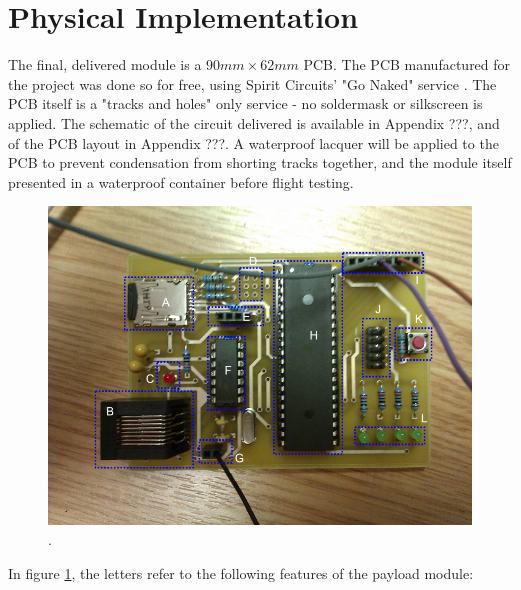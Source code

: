 \section{Physical Implementation}
\label{sec:PCB-implementation}

The final, delivered module is a $90mm\times62mm$ PCB. The PCB manufactured 
for the project was done so for free, using Spirit Circuits' "Go Naked"
service \cite{go-naked}. The PCB itself is a "tracks and holes" only service 
- no soldermask or silkscreen is applied. The schematic of the circuit 
delivered is available in Appendix ???, and of the PCB layout in Appendix 
???. A waterproof lacquer will be applied to the PCB to prevent condensation 
from shorting tracks together, and the module itself presented in a 
waterproof container before flight testing.

\begin{figure}[H]
        \centering
        \includegraphics[width=1.00\textwidth]{figures/PayloadImplementationA.png}
        . 
        \label{fig:PayloadImplementation}
\end{figure}

In figure \ref{fig:PayloadImplementation}, the letters refer to the following 
features of the payload module:

